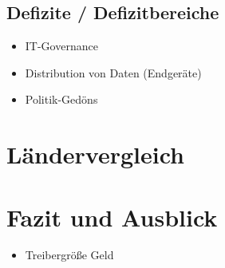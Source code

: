 	\subsection{Defizite / Defizitbereiche}
	\begin{itemize}
		\item IT-Governance
		\item Distribution von Daten (Endgeräte)
		\item Politik-Gedöns
	\end{itemize}
\section{Ländervergleich} \label{sec:laendervergleich}

\section{Fazit und Ausblick}
\begin{itemize}
	\item Treibergröße Geld
\end{itemize}
\newpage
{}
\setcounter{page}{3}

